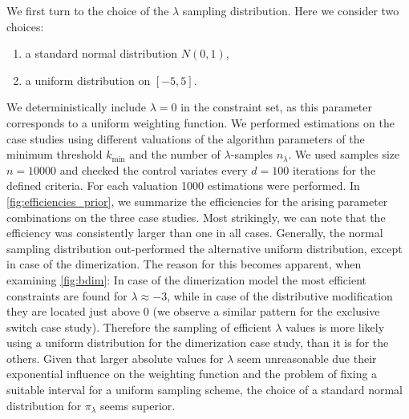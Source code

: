We first turn to the choice of the $\lambda$ sampling distribution. Here we
consider two choices:
\begin{enumerate}
    \item a standard normal distribution $N(0,1)$,
    \item a uniform distribution on $[-5,5]$.
\end{enumerate}
We deterministically include $\lambda=0$ in the constraint set, as this parameter
corresponds to a uniform weighting function.
We performed estimations on the case studies using different valuations of the
algorithm parameters of the minimum threshold $k_{\min}$ and
the number of $\lambda$-samples $n_{\lambda}$.
We used samples size $n=\num{10000}$ and checked the control  variates every $d=100$ iterations
for the defined criteria.
For each valuation \num{1000} estimations were performed.
In \autoref{fig:efficiencies_prior}, we summarize the efficiencies
for the arising parameter combinations on the three case studies.
Most strikingly, we can note that the efficiency was consistently larger than one in
all cases.
Generally, the normal sampling distribution out-performed the 
alternative uniform distribution, except in case of the dimerization.
The reason for this becomes apparent, when examining \autoref{fig:bdim}:
In case of the dimerization model the most efficient constraints are found for
$\lambda\approx -3$, while in case of the distributive modification they are located
 just above $0$ (we observe a similar pattern for the exclusive switch case study).
Therefore the sampling of efficient $\lambda$ values is more likely
using a uniform distribution for the dimerization case study, than it is for the others.
Given that larger absolute values for $\lambda$ seem unreasonable due 
their exponential influence on the weighting function and the problem of fixing
a suitable interval for a uniform sampling scheme, the choice of a standard normal
distribution for $\pi_{\lambda}$ seems superior.

